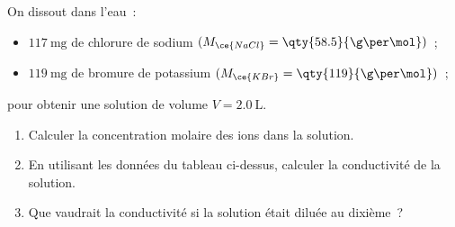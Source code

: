 On dissout dans l'eau~:
\begin{itemize}
    \item $\qty{117}{\mg}$ de chlorure de sodium
          $(M_{\ce{NaCl}}=\qty{58.5}{\g\per\mol})$~;
    \item $\qty{119}{\mg}$ de bromure de potassium
          $(M_{\ce{KBr}}=\qty{119}{\g\per\mol})$~;
\end{itemize}
pour obtenir une solution de volume $V=\qty{2.0}{\L}$.
\begin{enumerate}
    \item Calculer la concentration molaire des ions dans la solution.
    \item En utilisant les données du tableau ci-dessus, calculer la
          conductivité de la solution.
    \item Que vaudrait la conductivité si la solution était diluée au dixième~?
\end{enumerate}


